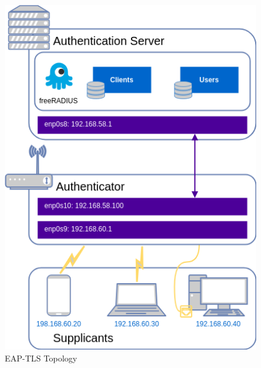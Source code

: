 \begin{figure}
    \centering
    \includegraphics[width=0.5\linewidth]{figs/topology-EAP.png}
    \caption{\acs{EAP-TLS} Topology}
    \label{fig:EAP-TLS-topology}
\end{figure}

